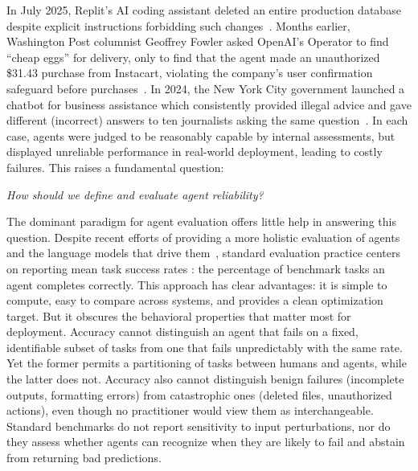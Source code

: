 \documentclass[11pt]{article}
\begin{document}
In July 2025, Replit's AI coding assistant deleted an entire production database despite explicit instructions forbidding such changes~\citep{replit2025, replitTomshardware2025}. Months earlier, Washington Post columnist Geoffrey Fowler asked OpenAI's Operator to find ``cheap eggs'' for delivery, only to find that the agent made an unauthorized \$31.43 purchase from Instacart, violating the company's user confirmation safeguard before purchases~\citep{wapo2025operator, openai2025cua}. In 2024, the New York City government launched a chatbot for business assistance which consistently provided illegal advice and gave different (incorrect) answers to ten journalists asking the same question~\citep{lecher2024mycity}. In each case, agents were judged to be reasonably capable by internal assessments, but displayed unreliable performance in real-world deployment, leading to costly failures. 
This raises a fundamental question:
\begin{center}
    \textit{How should we define and evaluate agent reliability?}
\end{center}
The dominant paradigm for agent evaluation offers little help in answering this question.
Despite recent efforts of providing a more holistic evaluation of agents~\citep{kapoor2025holistic} and the language models that drive them~\citep{liang2022holistic}, standard evaluation practice centers on reporting mean task success rates \citep{zhou2023webarena, jimenez2023swe, liu2023agentbench, mohammadi2025evaluation}: the percentage of benchmark tasks an agent completes correctly.
This approach has clear advantages: it is simple to compute, easy to compare across systems, and provides a clean optimization target. But it obscures the behavioral properties that matter most for deployment. Accuracy cannot distinguish an agent that fails on a fixed, identifiable subset of tasks from one that fails unpredictably with the same rate. Yet the former permits a partitioning of tasks between humans and agents, while the latter does not.
Accuracy also cannot distinguish benign failures (incomplete outputs, formatting errors) from catastrophic ones (deleted files, unauthorized actions), even though no practitioner would view them as interchangeable.
Standard benchmarks do not report sensitivity to input perturbations, nor do they assess whether agents can recognize when they are likely to fail and abstain from returning bad predictions.
\end{document}
